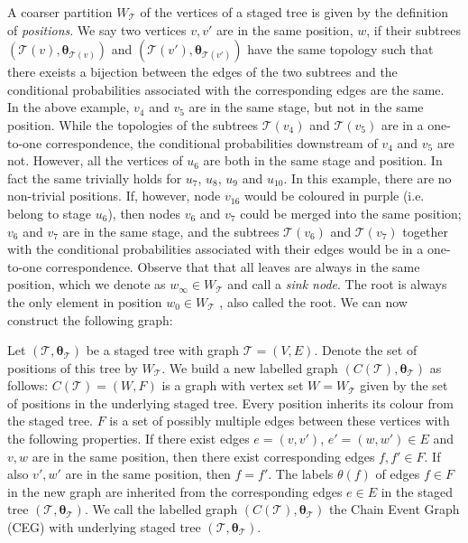 \documentclass[runningheads]{llncs}
\begin{document}
A coarser partition $W_{\mathcal{T}}$ of the vertices of a staged tree is given by the definition of \emph{positions}. We say two vertices $v, v'$ are in the same position, $w$, if their subtrees $(\mathcal{T}(v), \boldsymbol{\theta}_{\mathcal{T}(v)})$ and $(\mathcal{T}(v'), \boldsymbol{\theta}_{\mathcal{T}(v')})$ have the same topology such that there exeists a bijection between the edges of the two subtrees and the conditional probabilities associated with the corresponding edges are the same. \\
In the above example, $v_4$ and $v_5$ are in the same stage, but not in the same position. While the topologies of the subtrees $\mathcal{T}(v_4)$ and $\mathcal{T}(v_5)$ are in a one-to-one correspondence, the conditional probabilities downstream of $v_4$ and $v_5$ are not. However, all the vertices of $u_6$ are both in the same stage and position. In fact the same trivially holds for $u_7$, $u_8$, $u_9$ and $u_{10}$. 
In this example, there are no non-trivial positions. If, however, node $v_{16}$ would be coloured in purple (i.e. belong to stage $u_6$), then nodes $v_6$ and $v_7$ could be merged into the same position; $v_6$ and $v_7$ are in the same stage, and the subtrees $\mathcal{T}(v_6)$ and $\mathcal{T}(v_7)$ together with the conditional probabilities associated with their edges would be in a one-to-one correspondence. 
Observe that that all leaves are always in the same position, which we denote as $w_\infty \in W_{\mathcal{T}}$ and call a \emph{sink node}. The root is always the only element in position $w_0 \in W_{\mathcal{T}}$ , also called the root. We can now construct the following graph:
\begin{definition}
Let $(\mathcal{T} , \boldsymbol{\theta}_{\mathcal{T}})$ be a staged tree with graph $\mathcal{T} = (V, E)$. Denote the set of positions of this tree by $W_{\mathcal{T}}$. We build a new labelled graph $(C(\mathcal{T}) , \boldsymbol{\theta}_{\mathcal{T}})$ as follows:
$C(\mathcal{T}) = (W, F)$ is a graph with vertex set $W = W_{\mathcal{T}}$ given by the set of positions in the underlying staged tree. Every position inherits its colour from the staged tree. $F$ is a set of possibly multiple edges between these vertices with the following properties. If there exist edges $e = (v, v')$, $e' = (w, w') \in E$ and $v, w$ are in the same position, then there exist corresponding edges $f, f' \in F$. If also $v', w'$ are in the same position, then $f = f'$. The labels $\theta(f)$ of edges $f \in F$ in the new graph are inherited from the corresponding edges $e \in E$ in the staged tree $(\mathcal{T} , \boldsymbol{\theta}_{\mathcal{T}})$.
We call the labelled graph $(C(\mathcal{T}) , \boldsymbol{\theta}_{\mathcal{T}})$ the Chain Event Graph (CEG) with underlying staged tree $(\mathcal{T} , \boldsymbol{\theta}_{\mathcal{T}})$.
\end{definition}
\end{document}
